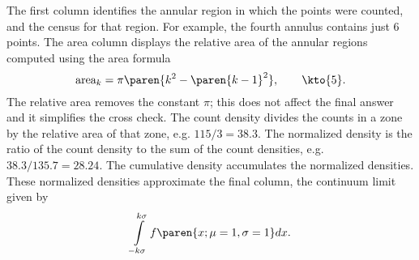 The first column identifies the annular region in which the points were counted, and the census for that region. For example, the fourth annulus contains just 6 points. The area column displays the relative area of the annular regions computed using the area formula
  \begin{equation*}   %
      \text{area}_{k} = \pi \paren{ k^{2} - \paren{k - 1}^{2} }, \qquad \kto{5}.
  \end{equation*}
The relative area removes the constant $\pi$; this does not affect the final answer and it simplifies the cross check.
The count density divides the counts in a zone by the relative area of that zone, e.g. $115 / 3 = 38.3$. The normalized density is the ratio of the count density to the sum of the count densities, e.g. $38.3 / 135.7 = 28.24$. The cumulative density accumulates the normalized densities. These normalized densities approximate the final column, the continuum limit given by
  \begin{equation*}   %
      \int\limits_{-k \sigma}^{k \sigma} f\paren{x;\mu = 1,\sigma = 1} dx .
  \end{equation*}


\endinput